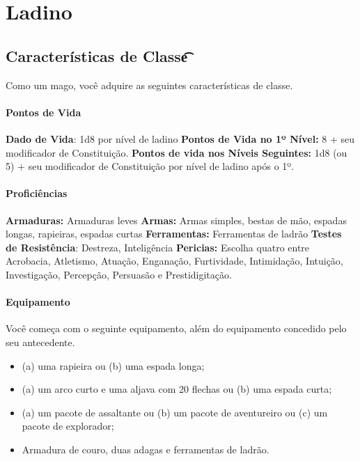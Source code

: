 \documentclass{RPG_Adventure}[2021/10/20]
\begin{document}

\chapter{Ladino}%
\label{cha:ladino}

\section*{Características de Classe\t\t}%
\label{sec:caracteristicas_de_classe}

Como um mago, você adquire as seguintes características de classe.

\subsubsection{Pontos de Vida}%
\label{ssub:pontos_de_vida}

\textbf{Dado de Vida}: 1d8 por nível de ladino \nl
\textbf{Pontos de Vida no 1º Nível:} 8 + seu modificador de Constituição. \nl
\textbf{Pontos de vida nos Níveis Seguintes:} 1d8 (ou 5) + seu modificador de
Constituição por nível de ladino após o 1º.

\subsubsection{Proficiências}%
\label{ssub:proficiencias}

\textbf{Armaduras:} Armaduras leves \nl
\textbf{Armas:} Armas simples, bestas de mão, espadas longas, rapieiras, espadas
curtas\nl
\textbf{Ferramentas:} Ferramentas de ladrão \jump
\textbf{Testes de Resistência}: Destreza, Inteligência \nl
\textbf{Pericias:} Escolha quatro entre Acrobacia, Atletismo, Atuação,
Enganação, Furtividade, Intimidação, Intuição, Investigação, Percepção,
Persuasão e Prestidigitação.

\subsubsection{Equipamento}%
\label{ssub:equipamento}

Você começa com o seguinte equipamento, além do equipamento concedido pelo seu
antecedente.
\begin{itemize}
    \item (a) uma rapieira ou (b) uma espada longa;
    \item (a) um arco curto e uma aljava com 20 flechas ou (b) uma espada curta;
    \item (a) um pacote de assaltante ou (b) um pacote de aventureiro ou (c) um
        pacote de explorador;
    \item Armadura de couro, duas adagas e ferramentas de ladrão.
\end{itemize}
\end{document}
